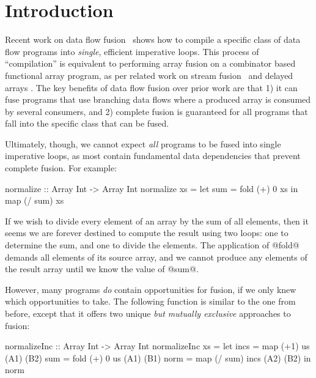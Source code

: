 \section{Introduction}

Recent work on data flow fusion~\cite{lippmeier2013flow} shows how to compile a specific class of data flow programs into \emph{single}, efficient imperative loops. This process of ``compilation'' is equivalent to performing array fusion on a combinator based functional array program, as per related work on stream fusion~\cite{coutts2007streamfusion} and delayed arrays \cite{keller2010repa}. The key benefits of data flow fusion over prior work are that 1) it can fuse programs that use branching data flows where a produced array is consumed by several consumers, and 2) complete fusion is guaranteed for all programs that fall into the specific class that can be fused. 



Ultimately, though, we cannot expect \emph{all} programs to be fused into single imperative loops, as most contain fundamental data dependencies that prevent complete fusion. For example:
\begin{code}
  normalize :: Array Int -> Array Int
  normalize xs = let sum = fold (+) 0 xs
                 in  map (/ sum) xs
\end{code}

If we wish to divide every element of an array by the sum of all elements, then it seems we are forever destined to compute the result using two loops: one to determine the sum, and one to divide the elements. The application of @fold@ demands all elements of its source array, and we cannot produce any elements of the result array until we know the value of @sum@.

However, many programs \emph{do} contain opportunities for fusion, if we only knew which opportunities to take. The following function is similar to the one from before, except that it offers two unique \emph{but mutually exclusive} approaches to fusion:


\begin{code}
 normalizeInc :: Array Int -> Array Int
 normalizeInc xs
  = let incs = map  (+1)    us      (A1) (B2)
        sum  = fold (+) 0   us      (A1) (B1)
        norm = map  (/ sum) incs    (A2) (B2)
    in  norm
\end{code}


